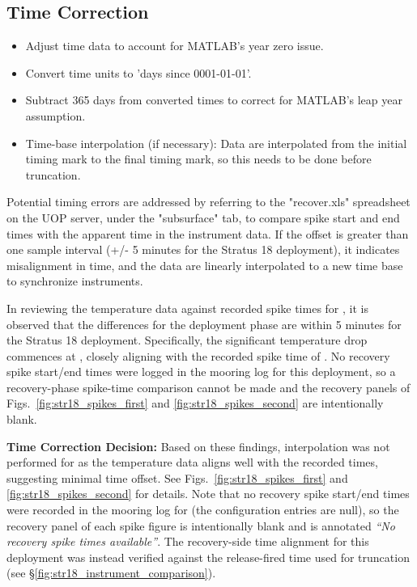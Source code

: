 \subsection{Time Correction}
\begin{itemize}
\item Adjust time data to account for MATLAB's year zero issue.
\item Convert time units to 'days since 0001-01-01'.
\item Subtract 365 days from converted times to correct for MATLAB's leap year assumption.
\item Time-base interpolation (if necessary): Data are interpolated from the initial timing mark to the final timing mark, 
so this needs to be done before truncation.
\end{itemize}

Potential timing errors are addressed by referring to the "recover.xls" spreadsheet on the UOP server, 
under the "subsurface" tab, to compare spike start and end times with the apparent time in the instrument data. 
If the offset is greater than one sample interval (+/- 5 minutes for the Stratus 18 deployment),
it indicates misalignment in time, and the data are linearly interpolated to a new time base to synchronize instruments.


In reviewing the temperature data against recorded spike times for \displayprojectname{} \casenumber{}, it is observed
that the differences for the deployment phase are within 5 minutes for the Stratus 18 deployment. Specifically, the significant temperature drop commences at \DeploymentSpike{}, closely aligning with
the recorded spike time of \DeploymentRecordedSpike{}. 
No recovery spike start/end times were logged in the mooring log for this deployment, so a recovery-phase spike-time comparison cannot be made and the recovery panels of Figs.~\ref{fig:str18_spikes_first} and \ref{fig:str18_spikes_second} are intentionally blank.

\textbf{Time Correction Decision:} Based on these findings, 
interpolation was not performed for \displayprojectname{} \casenumber{} as the temperature data 
aligns well with the recorded times, suggesting minimal time offset. 
See Figs.~\ref{fig:str18_spikes_first} and \ref{fig:str18_spikes_second} for details. Note that no recovery spike start/end times were recorded in the mooring log for \displayprojectname{} \casenumber{} (the configuration entries are null), so the recovery panel of each spike figure is intentionally blank and is annotated \textit{``No recovery spike times available''}. The recovery-side time alignment for this deployment was instead verified against the release-fired time used for truncation (see \S\ref{fig:str18_instrument_comparison}).


